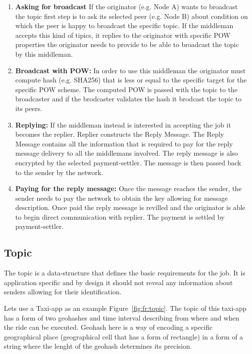\documentclass{article}
\begin{document}
\begin{enumerate}
	\item  \textbf{Asking for broadcast} If the originator (e.g. Node A) wants to broadcast the topic first step is to ask its selected peer (e.g. Node B) about condition on which the peer is happy to broadcast the specific topic. If the middleman accepts this kind of tipics, it replies to the originator with specific POW properties the originator needs to provide to be able to broadcast the topic by this middleman.
	\item  \textbf{Broadcast with POW:} In order to use this middleman the originator must compute hash (e.g. SHA256) that is less or equal to the specific target for the specific POW scheme. The computed POW is passed with the topic to the broadcaster and if the brodcaster validates the hash it brodcast the topic to its peers.
	\item  \textbf{Replying:} If the middleman instead is interested in accepting the job it becomes the replier. Replier constructs the Reply Message. The Reply Message contains all the information that is required to pay for the reply message delivery to all the middlemans involved. The reply message is also encrypted by the selected payment-settler. The message is then passed back to the sender by the network.
	\item  \textbf{Paying for the reply message:} Once the message reaches the sender, the sender needs to pay the network to obtain the key allowing for message description. Once paid the reply message is revilled and the originator is able to begin direct communication with replier. The payment is settled by payment-settler.
\end{enumerate}

\subsection{Topic}

The topic is a data-structure that defines the basic requirements for the job. It is application specific and by design it should not reveal any information about senders allowing for their identification.

Lets use a Taxi-app as an example {Figure~\ref{fig:fr:topic}}. The topic of this taxi-app has a form of two geohashes and time interval describing from where and when the ride can be executed. Geohash here is a way of encoding a specific geographical place (geographical cell that has a form of rectangle) in a form of a string where the lenght of the geohash determines its precision.
\end{document}

